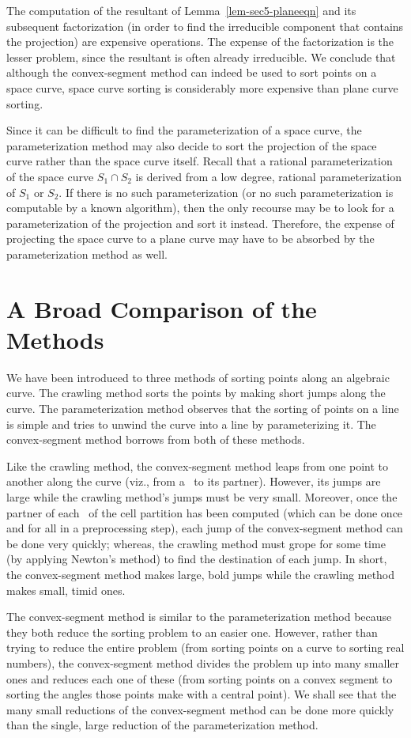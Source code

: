 The computation of the resultant 
of Lemma~\ref{lem-sec5-planeeqn} and its subsequent factorization 
(in order to find the irreducible component that contains the projection)
are expensive operations.
The expense of the factorization is the lesser problem,
since the resultant is often already irreducible.
We conclude that although the convex-segment 
method can indeed be used to sort points on a space curve,
space curve sorting is considerably more expensive than 
plane curve sorting.

Since it can be difficult to find the parameterization of a space curve,
the parameterization method may also decide to sort the projection of the
space curve rather than the space curve itself.
Recall that a rational parameterization of the space curve $S_{1} \cap S_{2}$
is derived from a low degree, rational parameterization of $S_{1}$ or $S_{2}$.
If there is no such parameterization (or no such parameterization
is computable by a known algorithm),
then the only recourse may be to look for a 
parameterization of the projection and sort it instead.
Therefore, the expense of projecting the space curve to a plane curve
may have to be absorbed by the parameterization method as well.
%
\section{A Broad Comparison of the Methods}

We have been introduced to three methods of sorting points along an
algebraic curve.
The crawling method sorts the points by making short jumps along the curve.
The parameterization method observes that the sorting of points 
on a line is simple and
tries to unwind the curve into a line by parameterizing it.
The convex-segment method borrows from both of these methods.

Like the crawling method, the convex-segment method 
leaps from one point to another along the curve
(viz., from a \wallpoint\ to its partner).
However, its jumps are large while the crawling method's jumps must be
very small.
Moreover, once the partner of each \wallpoint\ of the cell partition has been
computed (which can be done once and for all in a preprocessing step),
each jump of the convex-segment method can be
done very quickly; whereas, the crawling method 
must grope for some time (by applying
Newton's method) to find the destination of each jump.
In short, the convex-segment method 
makes large, bold jumps while the crawling method makes small, timid ones.

The convex-segment method is similar to the parameterization method because
they both reduce the sorting problem to an easier one.
However, rather than trying to reduce the entire problem 
(from sorting points
on a curve to sorting real numbers), the convex-segment method
divides the problem up into many
smaller ones and reduces each one of these (from sorting points on a convex 
segment to sorting the angles those points make with a central point).
We shall see that the many small reductions of the convex-segment method
can be done more quickly than the single, large reduction of
the parameterization method.

